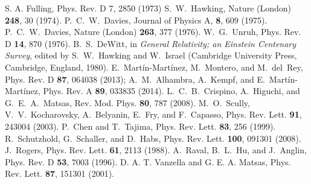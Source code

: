 \documentclass[aps,prl,nofootinbib,preprintnumbers,floatfix,twocolumn,superscriptaddress]{revtex4}
\begin{document}
\begin{thebibliography}{50}
S. A. Fulling, Phys. Rev. D 7, 2850 (1973)
S.~W.~Hawking, Nature (London) {\bf 248}, 30 (1974).
P.~C.~W.~Davies, Journal of Physics A, {\bf 8}, 609 (1975).
P.~C.~W.~Davies, Nature (London) {\bf 263}, 377 (1976).
W.~G.~Unruh, Phys. Rev. D {\bf 14}, 870 (1976).
B.~S.~DeWitt, in {\it General Relativity; an Einstein Centenary
Survey}, edited by S.~W.~Hawking and W.~Israel (Cambridge
University Press, Cambridge, England, 1980).
E.~Martín-Martínez, M.~Montero, and M.~del~Rey, Phys. Rev. D {\bf 87}, 064038 (2013);
A.~M.~Alhambra, A.~Kempf, and E.~Martín-Martínez, Phys. Rev. A {\bf 89}, 033835 (2014).
L.~C.~B.~Crispino, A.~Higuchi, and G.~E.~A.~Matsas, Rev. Mod. Phys. 
{\bf 80}, 787 (2008).
M.~O.~Scully, V.~V.~Kocharovsky, A.~Belyanin, E.~Fry, and 
F.~Capasso, Phys. Rev. Lett. {\bf 91}, 243004 (2003).
P.~Chen and T.~Tajima, Phys. Rev. Lett. {\bf 83}, 256 (1999). 
R.~Schutzhold, G.~Schaller, and D.~Habs, 
Phys. Rev. Lett. {\bf 100}, 091301 (2008). 
J.~Rogers, Phys. Rev. Lett. {\bf 61}, 2113 (1988).
A.~Raval, B.~L.~Hu, and J.~Anglin, Phys. Rev. D {\bf 53}, 7003 (1996).
D. A. T. Vanzella and G. E. A. Matsas, Phys. Rev. Lett. {\bf 87}, 151301 (2001).

\end{thebibliography}
\end{document}
